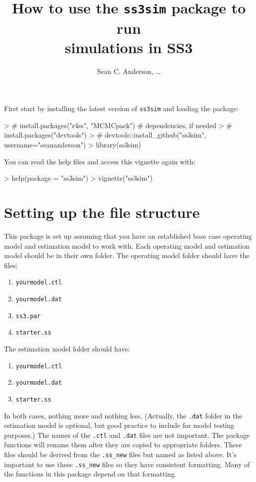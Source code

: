 \documentclass[12pt]{article}
\title{How to use the \texttt{ss3sim} package to run\\simulations in SS3}
\author{Sean C. Anderson, \ldots}
\date{}
\begin{document}
\maketitle

\noindent
First start by installing the latest version of \texttt{ss3sim} and loading the 
package:

\begin{Schunk}
\begin{Sinput}
> # install.packages("r4ss", "MCMCpack") # dependencies, if needed
> # install.packages("devtools")
> # devtools::install_github("ss3sim", username="seananderson")
> library(ss3sim)
\end{Sinput}
\end{Schunk}

\noindent
You can read the help files and access this vignette again with:

\begin{Schunk}
\begin{Sinput}
> help(package = "ss3sim")
> vignette("ss3sim")
\end{Sinput}
\end{Schunk}

\section*{Setting up the file structure}
This package is set up assuming that you have an established base case 
operating model and estimation model to work with. Each operating model and 
estimation model should be in their own folder. The operating model folder 
should have the files:
\begin{enumerate}
  \item \texttt{yourmodel.ctl}
  \item \texttt{yourmodel.dat}
  \item \texttt{ss3.par}
  \item \texttt{starter.ss}
\end{enumerate}

\noindent
The estimation model folder should have:

\begin{enumerate}
  \item \texttt{yourmodel.ctl}
  \item \texttt{yourmodel.dat}
  \item \texttt{starter.ss}
\end{enumerate}

\noindent
In both cases, nothing more and nothing less. (Actually, the \texttt{.dat} 
folder in the estimation model is optional, but good practice to include for 
model testing purposes.) The names of the \texttt{.ctl} and \texttt{.dat} files 
are not important. The package functions will rename them after they are copied 
to appropriate folders. These files should be derived from the 
\texttt{.ss\_new} files but named as listed above. It's important to use these 
\texttt{.ss\_new} files so they have consistent formatting. Many of the 
functions in this package depend on that formatting.
\end{document}
